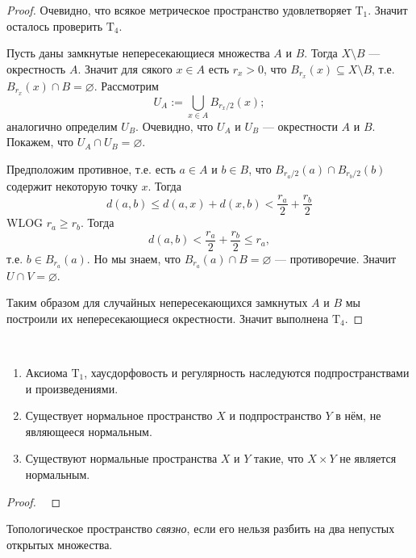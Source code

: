 \documentclass[12pt,a4paper]{article}
\newcommand{\T}{\ensuremath{\mathrm{T}}\xspace}
\begin{document}
    \begin{proof}
        Очевидно, что всякое метрическое пространство удовлетворяет $\T_1$. Значит осталось проверить $\T_4$.

        Пусть даны замкнутые непересекающиеся множества $A$ и $B$. Тогда $X \setminus B$ --- окрестность $A$. Значит для сякого $x \in A$ есть $r_x > 0$, что $B_{r_x}(x) \subseteq X \setminus B$, т.е. $B_{r_x}(x) \cap B = \varnothing$. Рассмотрим
        \[U_A := \bigcup_{x \in A} B_{r_x/2}(x);\]
        аналогично определим $U_B$. Очевидно, что $U_A$ и $U_B$ --- окрестности $A$ и $B$. Покажем, что $U_A \cap U_B = \varnothing$.

        Предположим противное, т.е. есть $a \in A$ и $b \in B$, что $B_{r_a/2}(a) \cap B_{r_b/2}(b)$ содержит некоторую точку $x$. Тогда
        \[d(a, b) \leqslant d(a, x) + d(x, b) < \frac{r_a}{2} + \frac{r_b}{2}\]
        WLOG $r_a \geqslant r_b$. Тогда
        \[d(a, b) < \frac{r_a}{2} + \frac{r_b}{2} \leqslant r_a,\]
        т.е. $b \in B_{r_a}(a)$. Но мы знаем, что $B_{r_a}(a) \cap B = \varnothing$ --- противоречие. Значит $U \cap V = \varnothing$.

        Таким образом для случайных непересекающихся замкнутых $A$ и $B$ мы построили их непересекающиеся окрестности. Значит выполнена $\T_4$.
    \end{proof}

    \begin{lemma}\ 
        \begin{enumerate}
            \item Аксиома $\T_1$, хаусдорфовость и регулярность наследуются подпространствами и произведениями.
            \item Существует нормальное пространство $X$ и подпространство $Y$ в нём, не являющееся нормальным.
            \item Существуют нормальные пространства $X$ и $Y$ такие, что $X \times Y$ не является нормальным.
        \end{enumerate}
    \end{lemma}

    \begin{proof}\ 
    \end{proof}

    \begin{definition}
        Топологическое пространство \emph{связно}, если его нельзя разбить на два непустых открытых множества.
    \end{definition}
\end{document}
